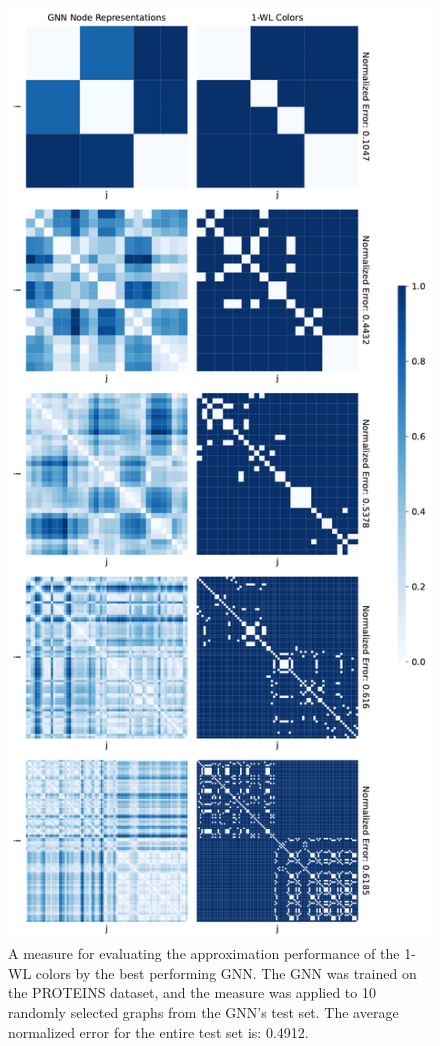 \begin{figure}[!ht]
\begin{minipage}[b]{0.45433880459\textwidth}
    \end{minipage}
    \hfill
    \begin{minipage}[b]{0.5256611954\textwidth}
        \includegraphics[width=\textwidth, right]{Figures/heatmaps_PROTEINS_1.pdf}
    \end{minipage}
    \hfill
    \caption{A measure for evaluating the approximation performance of the 1-WL colors by the best performing GNN. The GNN was trained on the PROTEINS dataset, and the measure was applied to 10 randomly selected graphs from the GNN's test set. The average normalized error for the entire test set is: 0.4912.}
\end{figure}